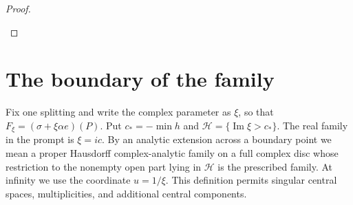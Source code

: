 \documentclass[11pt,a4paper]{article}
\theoremstyle{definition}
\begin{document}
\begin{proof}
\begin{enumerate}[label=\arabic*.]
\end{enumerate}
\end{proof}


\section{The boundary of the family}

Fix one splitting and write the complex parameter as $\xi$, so that
$F_\xi=(\sigma+\xi\alpha e)(P)$. Put
$c_*=-\min h$ and $\mathcal H=\{\operatorname{Im}\xi>c_*\}$.
The real family in the prompt is $\xi=ic$.
By an analytic extension across a boundary point we mean a proper
Hausdorff complex-analytic family on a full complex disc whose
restriction to the nonempty open part lying in $\mathcal H$ is
the prescribed family. At infinity we use the coordinate $u=1/\xi$.
This definition permits singular central spaces, multiplicities,
and additional central components.
\end{document}
